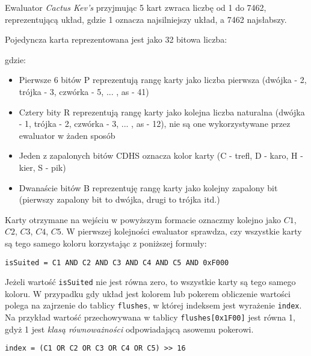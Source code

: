 Ewaluator \emph{Cactus Kev's} przyjmując 5 kart zwraca liczbę od 1 do 7462, reprezentującą układ, gdzie 1 oznacza najsilniejszy układ, a 7462 najsłabszy.

Pojedyncza karta reprezentowana jest jako 32 bitowa liczba:


gdzie:

\begin{itemize}
    \item Pierwsze 6 bitów P reprezentują rangę karty jako liczba pierwsza (dwójka - 2, trójka - 3, czwórka - 5, ... , as - 41)
    \item Cztery bity R reprezentują rangę karty jako kolejna liczba naturalna (dwójka - 1, trójka - 2, czwórka - 3, ... , as - 12), nie są one wykorzystywane przez ewaluator w żaden sposób \label{chapter:3-r-bits}
    \item Jeden z zapalonych bitów CDHS oznacza kolor karty (C - trefl, D - karo, H - kier, S - pik)
    \item Dwanaście bitów B reprezentuję rangę karty jako kolejny zapalony bit (pierwszy zapalony bit to dwójka, drugi to trójka itd.)
\end{itemize}

Karty otrzymane na wejściu w powyższym formacie oznaczmy kolejno jako $C1$, $C2$, $C3$, $C4$, $C5$. W pierwszej kolejności ewaluator sprawdza, czy wszystkie karty są tego samego koloru korzystając z poniższej formuły:

\begin{verbatim}
isSuited = C1 AND C2 AND C3 AND C4 AND C5 AND 0xF000
\end{verbatim}

Jeżeli wartość \verb+isSuited+ nie jest równa zero, to wszystkie karty są tego samego koloru. W przypadku gdy układ jest kolorem lub pokerem obliczenie wartości polega na zajrzenie do tablicy \verb+flushes+, w której indeksem jest wyrażenie \verb+index+. Na przykład wartość przechowywana w tablicy \verb+flushes[0x1F00]+ jest równa 1, gdyż 1 jest \emph{klasą równoważności} odpowiadającą asowemu pokerowi.

\begin{verbatim}
index = (C1 OR C2 OR C3 OR C4 OR C5) >> 16
\end{verbatim}

